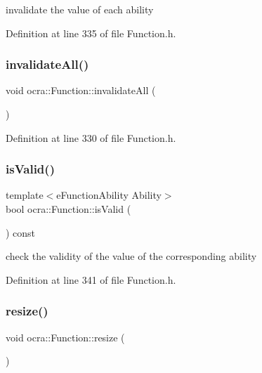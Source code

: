 invalidate the value of each ability 

Definition at line 335 of file Function.\+h.

\hypertarget{classocra_1_1Function_a2ebd8ade069fc19b03e6ab9cef2c09c3}{}\label{classocra_1_1Function_a2ebd8ade069fc19b03e6ab9cef2c09c3} 
\subsubsection{\texorpdfstring{invalidate\+All()}{invalidateAll()}\hspace{0.1cm}{\footnotesize\ttfamily [2/2]}}
{\footnotesize\ttfamily void ocra\+::\+Function\+::invalidate\+All (\begin{DoxyParamCaption}{ }\end{DoxyParamCaption})\hspace{0.3cm}{\ttfamily [inline]}}



Definition at line 330 of file Function.\+h.

\hypertarget{classocra_1_1Function_a277bdd8c1ece035f5ab5fc2b996ddced}{}\label{classocra_1_1Function_a277bdd8c1ece035f5ab5fc2b996ddced} 
\subsubsection{\texorpdfstring{is\+Valid()}{isValid()}}
{\footnotesize\ttfamily template$<$e\+Function\+Ability Ability$>$ \\
bool ocra\+::\+Function\+::is\+Valid (\begin{DoxyParamCaption}{ }\end{DoxyParamCaption}) const\hspace{0.3cm}{\ttfamily [inline]}}

check the validity of the value of the corresponding ability 

Definition at line 341 of file Function.\+h.

\hypertarget{classocra_1_1Function_aa59cd6d7965f6b2222261ef460d4899c}{}\label{classocra_1_1Function_aa59cd6d7965f6b2222261ef460d4899c} 
\subsubsection{\texorpdfstring{resize()}{resize()}}
{\footnotesize\ttfamily void ocra\+::\+Function\+::resize (\begin{DoxyParamCaption}{ }\end{DoxyParamCaption})\hspace{0.3cm}{\ttfamily [protected]}}

